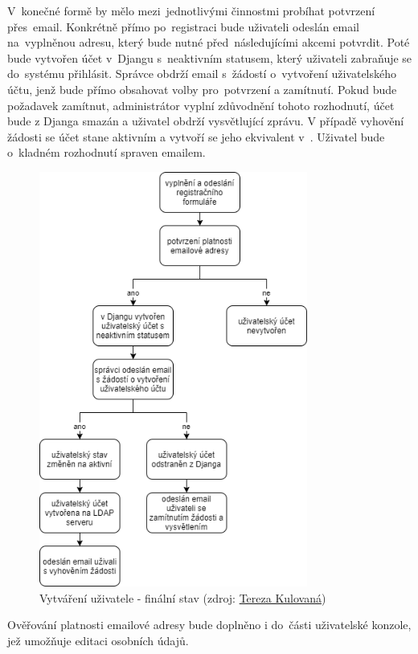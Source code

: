V~konečné formě by mělo mezi~jednotlivými činnostmi probíhat potvrzení
\linebreak přes~email. Konkrétně přímo po~registraci bude uživateli odeslán email
na~vyplněnou adresu, který bude nutné před~následujícími akcemi
potvrdit. Poté bude vytvořen účet v~Djangu s~neaktivním statusem,
který uživateli zabraňuje se do~systému přihlásit. Správce obdrží
email s~žádostí o~vytvoření uživatelského účtu, jenž bude přímo
obsahovat volby pro~potvrzení a zamítnutí. Pokud bude požadavek
zamítnut, administrátor vyplní zdůvodnění tohoto rozhodnutí, účet bude
z Djanga smazán a uživatel obdrží vysvětlující zprávu. V případě
vyhovění žádosti se účet stane aktivním a vytvoří se jeho ekvivalent 
v~. Uživatel bude o~kladném rozhodnutí spraven emailem.
  
\begin{figure}[H] \centering
    \includegraphics[width=250pt]{./pictures/my_console_final_version_cz.png}
    \caption[Vytváření uživatele - finální stav]{Vytváření uživatele - finální stav (zdroj:
	\href{}{Tereza Kulovaná})}
    \label{fig:admin-final}
\end{figure}

Ověřování platnosti emailové adresy bude doplněno i do~části
uživatelské konzole, jež umožňuje editaci osobních údajů.

